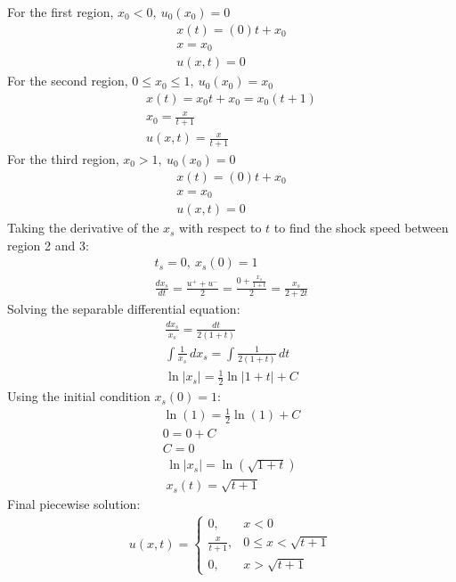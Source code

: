 \documentclass[letterpaper,11pt]{article}
\begin{document}
    For the first region, $x_0 < 0,\ u_0(x_0) = 0$
    \begin{gather*}
        x(t) = (0)t + x_0 \\
        x = x_0 \\
        u(x,t) = 0
    \end{gather*}
    For the second region, $0 \leq x_0 \leq 1,\ u_0(x_0) = x_0$
    \begin{gather*}
        x(t) = x_0 t + x_0 = x_0(t + 1) \\
        x_0 = \frac{x}{t + 1} \\
        u(x,t) = \frac{x}{t + 1}
    \end{gather*}
    For the third region, $x_0 > 1,\ u_0(x_0) = 0$
    \begin{gather*}
        x(t) = (0)t + x_0 \\
        x = x_0 \\
        u(x,t) = 0
    \end{gather*}
    Taking the derivative of the $x_s$ with respect to $t$ to find the shock speed between region 2 and 3:
    \begin{gather*}
        t_s = 0,\ x_s(0) = 1 \\
        \frac{dx_s}{dt} = \frac{u^+ + u^-}{2} = \frac{0 + \frac{x_s}{1+t}}{2} = \frac{x_s}{2+2t}
    \end{gather*}
    Solving the separable differential equation:
    \begin{gather*}
        \frac{dx_s}{x_s} = \frac{dt}{2(1+t)} \\
        \int \frac{1}{x_s} \,dx_s = \int \frac{1}{2(1+t)} \,dt \\
        \ln|x_s| = \frac{1}{2}\ln|1+t| + C
    \end{gather*}
    Using the initial condition $x_s(0) = 1$:
    \begin{gather*}
        \ln(1) = \frac{1}{2}\ln(1) + C \\
        0 = 0 + C \\
        C = 0
    \end{gather*}
    \begin{gather*}
        \ln|x_s| = \ln\left(\sqrt{1+t}\right) \\
        x_s(t) = \sqrt{t+1}
    \end{gather*}
    Final piecewise solution:
    \begin{gather*}
        u(x,t) = \begin{cases}
                     0, & x < 0 \\
                     \frac{x}{t+1}, & 0 \leq x < \sqrt{t+1} \\
                     0, & x > \sqrt{t+1}
        \end{cases}
    \end{gather*}
\end{document}
